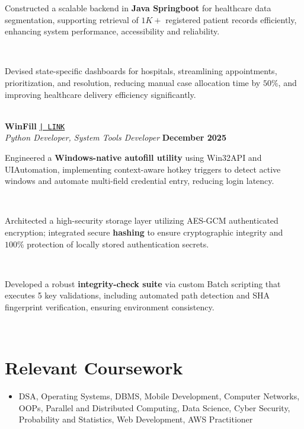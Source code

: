 \documentclass[a4paper,10pt]{article}
\begin{document}
\noindent\makebox[1.5em][l]{--}%
\parbox[t]{\dimexpr\linewidth-1.5em\relax}{%
Constructed a scalable backend in \textbf{Java Springboot} for healthcare data segmentation, supporting retrieval of $1K+$ registered patient records efficiently, enhancing system performance, accessibility and reliability.} \\[0pt]

\noindent\makebox[1.5em][l]{--}%
\parbox[t]{\dimexpr\linewidth-1.5em\relax}{%
Devised state-specific dashboards for hospitals, streamlining appointments, prioritization, and resolution, reducing manual case allocation time by $50\%$, and improving healthcare delivery efficiency significantly.} \\[4pt]

\noindent
\textbf{WinFill}
\href{https://github.com/ppriyanshu26/WinFill}{\texttt{| LINK}} \\
\textit{Python Developer, System Tools Developer} \hfill \textbf{December 2025} \\[-8pt]

\noindent\makebox[1.5em][l]{--}%
\parbox[t]{\dimexpr\linewidth-1.5em\relax}{%
Engineered a \textbf{Windows-native autofill utility} using Win32API and UIAutomation, implementing context-aware hotkey triggers to detect active windows and automate multi-field credential entry, reducing login latency.} \\[0pt]

\noindent\makebox[1.5em][l]{--}%
\parbox[t]{\dimexpr\linewidth-1.5em\relax}{%
Architected a high-security storage layer utilizing AES-GCM authenticated encryption; integrated secure \textbf{hashing} to ensure cryptographic integrity and $100\%$ protection of locally stored authentication secrets.} \\[0pt]

\noindent\makebox[1.5em][l]{--}%
\parbox[t]{\dimexpr\linewidth-1.5em\relax}{%
Developed a robust \textbf{integrity-check suite} via custom Batch scripting that executes 5 key validations, including automated path detection and SHA fingerprint verification, ensuring environment consistency.} \\[4pt]


\vspace{-4pt}
\section{Relevant Coursework}
  \begin{itemize}
    \item DSA, Operating Systems, DBMS, Mobile Development, Computer Networks, OOPs, Parallel and Distributed Computing, Data Science, Cyber Security, Probability and Statistics, Web Development, AWS Practitioner
  \end{itemize}
\end{document}
